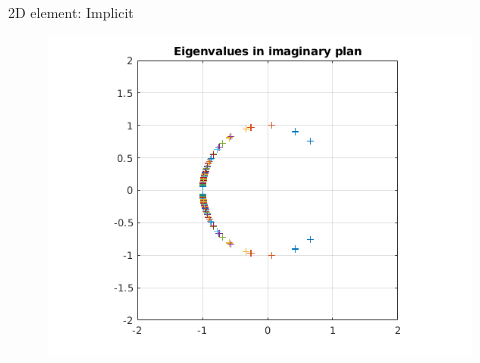 \begin{frame}{2D element: Implicit}
\begin{figure}[ht] 
  \label{ fig7} 
  \begin{minipage}[b]{0.5\linewidth}
    \centering
    \includegraphics[scale=.35]{images/2D-imp-1.png} \\


\end{minipage}
\end{figure}
\end{frame}
